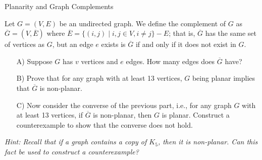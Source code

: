\begin{homeworkProblem}{Planarity and Graph Complements}

    Let $G = (V, E)$ be an undirected graph.  We define the complement of $G$ as $\overline{G} = (V, \overline{E})$ where $\overline{E} = \{(i,j) \mid i,j \in V, i \neq j\} - E$; that is, $\overline{G}$ has the same set of vertices as $G$, but an edge $e$ exists is $\overline{G}$ if and only if it does not exist in $G$.

    \begin{itemize}
        \item[A)] Suppose $G$ has $v$ vertices and $e$ edges.  How many edges does $\overline{G}$ have?
        \item[B)] Prove that for any graph with at least 13 vertices, $G$ being planar implies that $\overline{G}$ is non-planar.
        \item[C)] Now consider the converse of the previous part, i.e., for any graph $G$ with at least 13 vertices, if $\overline{G}$ is non-planar, then $G$ is planar. Construct a counterexample to show that the converse does not hold.
    \end{itemize}

    \textit{Hint: Recall that if a graph contains a copy of $K_5$, then it is non-planar. Can this fact be used to construct a counterexample?}
        
\end{homeworkProblem}